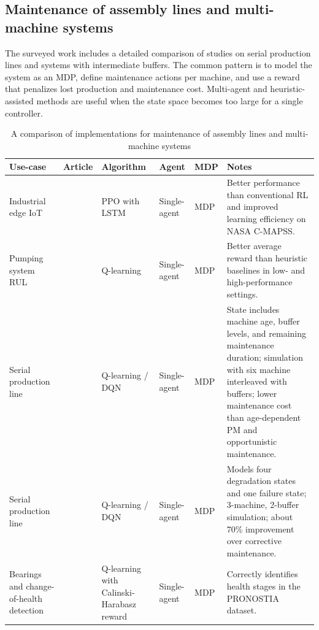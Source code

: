 \documentclass[12pt,oneside]{book}
\renewcommand{\arraystretch}{1.5}
\begin{document}
\subsection{Maintenance of assembly lines and multi-machine systems}
The surveyed work includes a detailed comparison of studies on serial production lines and systems with intermediate buffers. The common pattern is to model the system as an MDP, define maintenance actions per machine, and use a reward that penalizes lost production and maintenance cost. Multi-agent and heuristic-assisted methods are useful when the state space becomes too large for a single controller.

\begin{landscape}
	\begin{table}[p]
		\renewcommand{\arraystretch}{1.3}
		\begin{minipage}{\textwidth}
			\caption{A comparison of implementations for maintenance of assembly lines and multi-machine systems}\label{tbl:SchedulePM}
			\begin{tabular}{@{}L{3.5cm}L{2.5cm}L{3.5cm}L{1.5cm}L{1.5cm}L{9.5cm}@{}}
				\toprule
				\textbf{Use-case} & \textbf{Article} & \textbf{Algorithm} & \textbf{Agent} & \textbf{MDP} & \textbf{Notes}\\
				\midrule
				Industrial edge IoT & \cite{Ong2021} & PPO with LSTM & Single-agent & MDP & Better performance than conventional RL and improved learning efficiency on NASA C-MAPSS.\\
				Pumping system RUL & \cite{Bellani2019PHM} & Q-learning & Single-agent & MDP & Better average reward than heuristic baselines in low- and high-performance settings.\\
				Serial production line & \cite{Huang2020} & Q-learning / DQN & Single-agent & MDP & State includes machine age, buffer levels, and remaining maintenance duration; simulation with six machine interleaved with buffers; lower maintenance cost than age-dependent PM and opportunistic maintenance.\\
				Serial production line & \cite{Huang2019523} & Q-learning / DQN & Single-agent & MDP & Models four degradation states and one failure state; 3-machine, 2-buffer simulation; about 70\% improvement over corrective maintenance.\\
				Bearings and change-of-health detection & \cite{Cheng2018} & Q-learning with Calinski-Harabasz reward & Single-agent & MDP & Correctly identifies health stages in the PRONOSTIA dataset.\\

\end{tabular}
\end{minipage}
\end{table}
\end{landscape}
\end{document}
